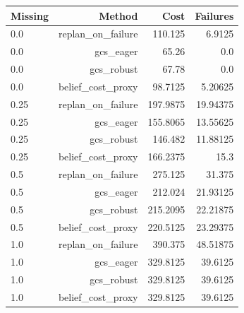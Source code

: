 \begin{tabular}{lrrr}
\toprule
Missing & Method & Cost & Failures \\
\midrule
0.0 & replan\_on\_failure & 110.125 & 6.9125 \\
0.0 & gcs\_eager & 65.26 & 0.0 \\
0.0 & gcs\_robust & 67.78 & 0.0 \\
0.0 & belief\_cost\_proxy & 98.7125 & 5.20625 \\
0.25 & replan\_on\_failure & 197.9875 & 19.94375 \\
0.25 & gcs\_eager & 155.8065 & 13.55625 \\
0.25 & gcs\_robust & 146.482 & 11.88125 \\
0.25 & belief\_cost\_proxy & 166.2375 & 15.3 \\
0.5 & replan\_on\_failure & 275.125 & 31.375 \\
0.5 & gcs\_eager & 212.024 & 21.93125 \\
0.5 & gcs\_robust & 215.2095 & 22.21875 \\
0.5 & belief\_cost\_proxy & 220.5125 & 23.29375 \\
1.0 & replan\_on\_failure & 390.375 & 48.51875 \\
1.0 & gcs\_eager & 329.8125 & 39.6125 \\
1.0 & gcs\_robust & 329.8125 & 39.6125 \\
1.0 & belief\_cost\_proxy & 329.8125 & 39.6125 \\
\bottomrule
\end{tabular}
